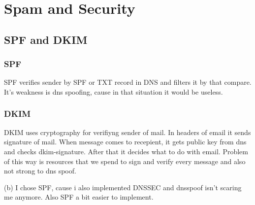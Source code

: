 \documentclass[10pt]{article}
\begin{document}
\section{Spam and Security\newline}
    \subsection{SPF and DKIM}
        \subsubsection{SPF}
            SPF verifies sender by SPF or TXT record in DNS and filters it by that compare. It's weakness is dns spoofing, cause in that situation it would be useless.

        \subsubsection{DKIM}
            DKIM uses cryptography for verifiyng sender of mail. In headers of email it sends signature of mail. When message comes to recepient, it gets public key from dns and checks dkim-signature. After that it decides what to do with email. Problem of this way is resources that we spend to sign and verify every message and also not strong to dns spoof.

    (b) I chose SPF, cause i also implemented DNSSEC and dnsspoof isn't scaring me anymore. Also SPF a bit easier to implement.
\end{document}
